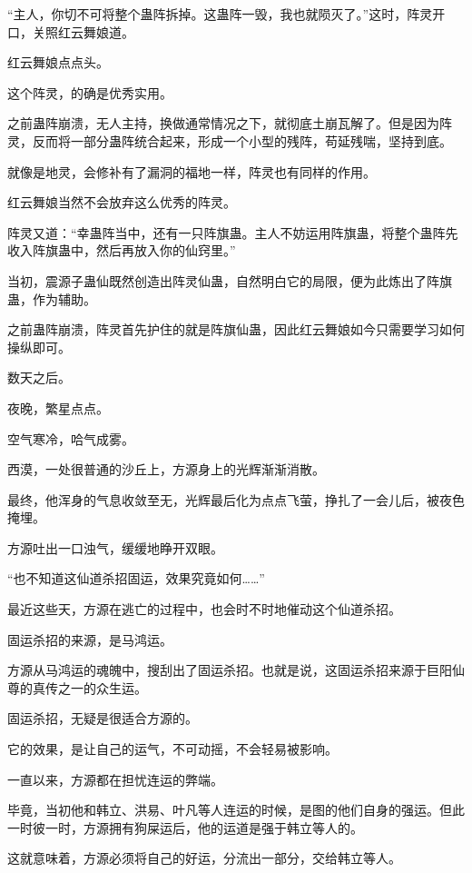 
\begin{this_body}



“主人，你切不可将整个蛊阵拆掉。这蛊阵一毁，我也就陨灭了。”这时，阵灵开口，关照红云舞娘道。

红云舞娘点点头。

这个阵灵，的确是优秀实用。

之前蛊阵崩溃，无人主持，换做通常情况之下，就彻底土崩瓦解了。但是因为阵灵，反而将一部分蛊阵统合起来，形成一个小型的残阵，苟延残喘，坚持到底。

就像是地灵，会修补有了漏洞的福地一样，阵灵也有同样的作用。

红云舞娘当然不会放弃这么优秀的阵灵。

阵灵又道：“幸蛊阵当中，还有一只阵旗蛊。主人不妨运用阵旗蛊，将整个蛊阵先收入阵旗蛊中，然后再放入你的仙窍里。”

当初，震源子蛊仙既然创造出阵灵仙蛊，自然明白它的局限，便为此炼出了阵旗蛊，作为辅助。

之前蛊阵崩溃，阵灵首先护住的就是阵旗仙蛊，因此红云舞娘如今只需要学习如何操纵即可。

数天之后。

夜晚，繁星点点。

空气寒冷，哈气成雾。

西漠，一处很普通的沙丘上，方源身上的光辉渐渐消散。

最终，他浑身的气息收敛至无，光辉最后化为点点飞萤，挣扎了一会儿后，被夜色掩埋。

方源吐出一口浊气，缓缓地睁开双眼。

“也不知道这仙道杀招固运，效果究竟如何……”

最近这些天，方源在逃亡的过程中，也会时不时地催动这个仙道杀招。

固运杀招的来源，是马鸿运。

方源从马鸿运的魂魄中，搜刮出了固运杀招。也就是说，这固运杀招来源于巨阳仙尊的真传之一的众生运。

固运杀招，无疑是很适合方源的。

它的效果，是让自己的运气，不可动摇，不会轻易被影响。

一直以来，方源都在担忧连运的弊端。

毕竟，当初他和韩立、洪易、叶凡等人连运的时候，是图的他们自身的强运。但此一时彼一时，方源拥有狗屎运后，他的运道是强于韩立等人的。

这就意味着，方源必须将自己的好运，分流出一部分，交给韩立等人。


\end{this_body}
